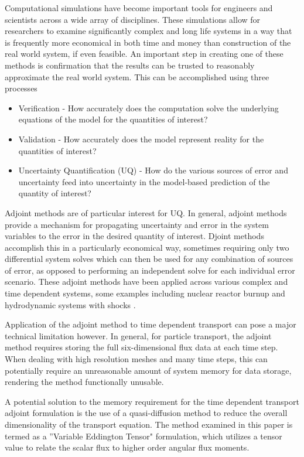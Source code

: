 \documentclass{article}
\begin{document}
Computational simulations have become important tools for engineers and scientists across a wide array of disciplines. These simulations allow for researchers to examine significantly complex and long life systems in a way that is frequently more economical in both time and money than construction of the real world system, if even feasible. An important step in creating one of these methods is confirmation that the results can be trusted to reasonably approximate the real world system. This can be accomplished using three processes \cite{NRCVVUQ}
\begin{itemize}
\item Verification - How accurately does the computation solve the underlying equations of the model for the quantities of interest?
\item Validation - How accurately does the model represent reality for the quantities of interest?
\item Uncertainty Quantification (UQ) -  How do the various sources of error and uncertainty feed into uncertainty in the model-based prediction of the quantity of interest?
\end{itemize}

Adjoint methods are of particular interest for UQ. In general, adjoint methods provide a mechanism for propagating uncertainty and error in the system variables to the error in the desired quantity of interest. Djoint methods accomplish this in a particularly economical way, sometimes requiring only two differential system solves which can then be used for any combination of sources of error, as opposed to performing an independent solve for each individual error scenario. These adjoint methods have been applied across various complex and time dependent systems, some examples including nuclear reactor burnup \cite{Stripling} and hydrodynamic systems with shocks \cite{Wildey}.

Application of the adjoint method to time dependent transport can pose a major technical limitation however. In general, for particle transport, the adjoint method requires storing the full six-dimensional flux data at each time step. When dealing with high resolution meshes and many time steps, this can potentially require an unreasonable amount of system memory for data storage, rendering the method functionally unusable.

A potential solution to the memory requirement for the time dependent transport adjoint formulation is the use of a quasi-diffusion method to reduce the overall dimensionality of the transport equation. The method examined in this paper is termed  as a ''Variable Eddington Tensor" formulation, which utilizes a tensor value to relate the scalar flux to higher order angular flux moments. 
\end{document}
